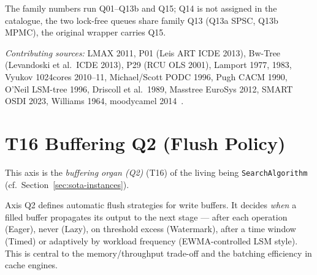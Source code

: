 The family numbers run Q01--Q13b and Q15; Q14 is not assigned in the catalogue, the two lock-free queues share family Q13 (Q13a SPSC, Q13b MPMC), the original wrapper carries Q15.

\emph{Contributing sources:} LMAX 2011, P01 (Leis ART ICDE 2013), Bw-Tree (Levandoski et al.\ ICDE 2013), P29 (RCU OLS 2001), Lamport 1977, 1983, Vyukov 1024cores 2010--11, Michael/\allowbreak{}Scott PODC 1996, Pugh CACM 1990, O'Neil LSM-tree 1996, Driscoll et al.\ 1989, Masstree Euro\allowbreak{}Sys 2012, SMART OSDI 2023, Williams 1964, moodycamel 2014~\cite{thompson2011disruptor,leis2013art,levandoski2013bwtree,mckenney2001rcu,lamport_spsc,lamport1983specifying,vyukov_mpmc,michael1996queue,pugh1990skiplist,oneil1996lsm,driscoll1989persistent,mao2012masstree,luo2023smart,williams1964heapsort,desrochers_concurrentqueue}.

\section{T16 Buffering Q2 (Flush Policy)}

This axis is the \emph{buffering organ (Q2)} (T16) of the living being \texttt{SearchAlgorithm} (cf.\ Section~\ref{sec:sota-instances}).

Axis Q2 defines automatic flush strategies for write buffers. It decides \emph{when} a filled buffer propagates its output to the next stage --- after each operation (Eager), never (Lazy), on threshold excess (Watermark), after a time window (Timed) or adaptively by workload frequency (EWMA-controlled LSM style). This is central to the memory/\allowbreak{}throughput trade-off and the batching efficiency in cache engines.

